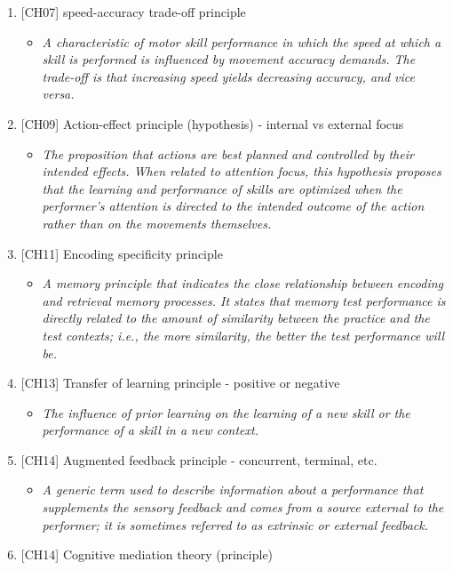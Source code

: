 \documentclass[
  letterpaper,
  DIV=11,
  numbers=noendperiod]{scrartcl}
\providecommand{\tightlist}{%
  \setlength{\itemsep}{0pt}\setlength{\parskip}{0pt}}\usepackage{longtable,booktabs,array}
\begin{document}
\begin{enumerate}
\def\labelenumi{\arabic{enumi}.}
\item
  {[}CH07{]} speed-accuracy trade-off principle

  \begin{itemize}
  \tightlist
  \item
    \emph{A characteristic of motor skill performance in which the speed
    at which a skill is performed is influenced by movement accuracy
    demands. The trade-off is that increasing speed yields decreasing
    accuracy, and vice versa.}
  \end{itemize}
\item
  {[}CH09{]} Action-effect principle (hypothesis) - internal vs external
  focus

  \begin{itemize}
  \tightlist
  \item
    \emph{The proposition that actions are best planned and controlled
    by their intended effects. When related to attention focus, this
    hypothesis proposes that the learning and performance of skills are
    optimized when the performer's attention is directed to the intended
    outcome of the action rather than on the movements themselves.}
  \end{itemize}
\item
  {[}CH11{]} Encoding specificity principle

  \begin{itemize}
  \tightlist
  \item
    \emph{A memory principle that indicates the close relationship
    between encoding and retrieval memory processes. It states that
    memory test performance is directly related to the amount of
    similarity between the practice and the test contexts; i.e., the
    more similarity, the better the test performance will be.}
  \end{itemize}
\item
  {[}CH13{]} Transfer of learning principle - positive or negative

  \begin{itemize}
  \tightlist
  \item
    \emph{The influence of prior learning on the learning of a new skill
    or the performance of a skill in a new context.}
  \end{itemize}
\item
  {[}CH14{]} Augmented feedback principle - concurrent, terminal, etc.

  \begin{itemize}
  \tightlist
  \item
    \emph{A generic term used to describe information about a
    performance that supplements the sensory feedback and comes from a
    source external to the performer; it is sometimes referred to as
    extrinsic or external feedback.}
  \end{itemize}
\item
  {[}CH14{]} Cognitive mediation theory (principle)


\end{enumerate}
\end{document}
